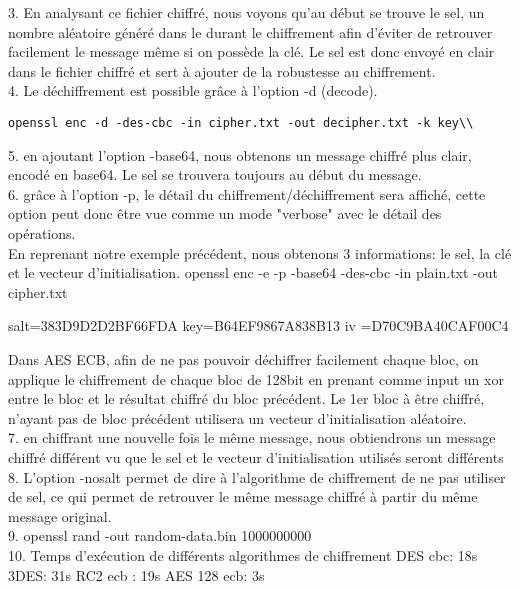 \documentclass[12pt, oneside]{article}
\begin{document}
3. En analysant ce fichier chiffré, nous voyons qu'au début se trouve le sel, un nombre aléatoire généré dans le durant le chiffrement afin d'éviter de retrouver facilement le message même si on possède la clé. Le sel est donc envoyé en clair dans le fichier chiffré et sert à ajouter de la robustesse au chiffrement.\\

4. Le déchiffrement est possible grâce à l'option -d (decode).
\begin{verbatim}
openssl enc -d -des-cbc -in cipher.txt -out decipher.txt -k key\\
\end{verbatim}

5. en ajoutant l'option -base64, nous obtenons un message chiffré plus clair, encodé en base64. Le sel se trouvera toujours au début du message. \\

6. grâce à l'option -p, le détail du chiffrement/déchiffrement sera affiché, cette option peut donc être vue comme un mode "verbose" avec le détail des opérations. \\

En reprenant notre exemple précédent, nous obtenons 3 informations: le sel, la clé et le vecteur d'initialisation. 
openssl enc -e -p -base64 -des-cbc -in plain.txt -out cipher.txt

salt=383D9D2D2BF66FDA
key=B64EF9867A838B13
iv =D70C9BA40CAF00C4

Dans AES ECB, afin de ne pas pouvoir déchiffrer facilement chaque bloc, on applique le chiffrement de chaque bloc de 128bit en prenant comme input un xor entre le bloc et le résultat chiffré du bloc précédent. Le 1er bloc à être chiffré, n'ayant pas de bloc précédent utilisera un vecteur d'initialisation aléatoire. \\

7. en  chiffrant une nouvelle fois le même message, nous obtiendrons un message chiffré différent vu que le sel et le vecteur d'initialisation utilisés seront différents\\

8. L'option -nosalt permet de dire à l'algorithme de chiffrement de ne pas utiliser de sel, ce qui permet de retrouver le même message chiffré à partir du même message original. \\

9. openssl rand -out random-data.bin 1000000000\\

10. Temps d'exécution de différents algorithmes de chiffrement
DES cbc: 18s
3DES: 31s
RC2 ecb : 19s
AES 128 ecb: 3s\\
\end{document}
